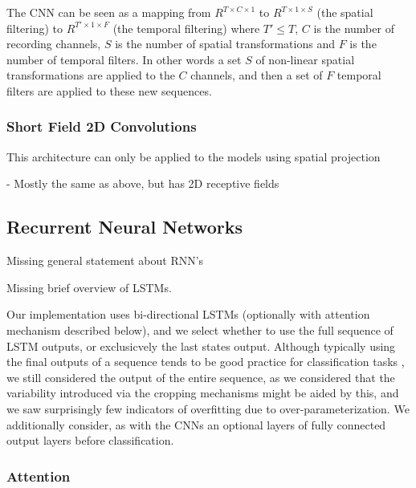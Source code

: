 \documentclass[utf8]{frontiersSCNS} %
\begin{document}
The CNN can be seen as a mapping from $R^{T \times C \times 1}$ to $R^{T \times 1 \times S}$ (the spatial filtering) to $R^{T' \times 1 \times F }$ (the temporal filtering) where $T' \leq T$, $C$ is the number of recording channels, $S$ is the number of spatial transformations and $F$ is the number of temporal filters. In other words a set $S$ of non-linear spatial transformations are applied to the $C$ channels, and then a set of $F$ temporal filters are applied to these new sequences.

\subsubsection{Short Field 2D Convolutions}

This architecture can only be applied to the models using spatial projection

- Mostly the same as above, but has 2D receptive fields
 
\subsection{Recurrent Neural Networks} \label{sec:rnns}

Missing general statement about RNN's

Missing brief overview of LSTMs.

Our implementation uses bi-directional LSTMs (optionally with attention mechanism described below), and we select whether to use the full sequence of LSTM outputs, or exclusicvely the last states output. Although typically using the final outputs of a sequence tends to be good practice for classification tasks \cite{}, we still considered the output of the entire sequence, as we considered that the variability introduced via the cropping mechanisms might be aided by this, and we saw surprisingly few indicators of overfitting due to over-parameterization. We additionally consider, as with the CNNs an optional layers of fully connected output layers before classification.

\subsubsection{Attention}

\end{document}
